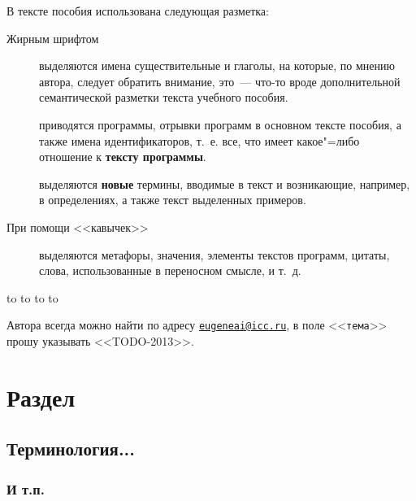 \documentclass[14pt, openany, twoside, final]{extbook} %
\begin{document}
В тексте пособия использована следующая разметка:
\begin{description}
\item[Жирным шрифтом] выделяются имена существительные и глаголы, на которые, по мнению автора, следует обратить внимание, это~--- что-то вроде дополнительной семантической разметки текста учебного пособия.
\item[] приводятся программы, отрывки программ в основном тексте пособия, а также имена идентификаторов, т.~е. все, что имеет какое"=либо отношение к {\bf тексту программы}.
\item[] выделяются {\bf новые} термины, вводимые в текст и возникающие, например, в определениях, а также текст выделенных примеров.
\item[\normalfont При помощи <<кавычек>>] выделяются метафоры, значения, элементы текстов программ, цитаты, слова, использованные в переносном смысле, и т.~д.
\end{description}

\medskip
\noindent\hbox to \linewidth{\hfill\sf Старший~научный сотрудник ИДСТУ СО РАН,}
\noindent\hbox to \linewidth{\hfill\sf доцент кафедры ИТ ИМЭИ ИГУ}
\noindent\hbox to \linewidth{\hfill\sf кандидат~технических~наук}
\noindent\hbox to \linewidth{\hfill\sf Е.~А.~Черкашин}

\vfill
\makeatletter
{} Автора всегда можно найти по адресу \href{mailto:eugeneai@icc.ru}{\tt{}eugeneai@icc.ru}, в поле <<{\tt тема}>> прошу указывать <<TODO-2013>>.
\makeatother

\chapter{Раздел}


\section{Терминология...}


\subsection{И т.п.}
\end{document}
